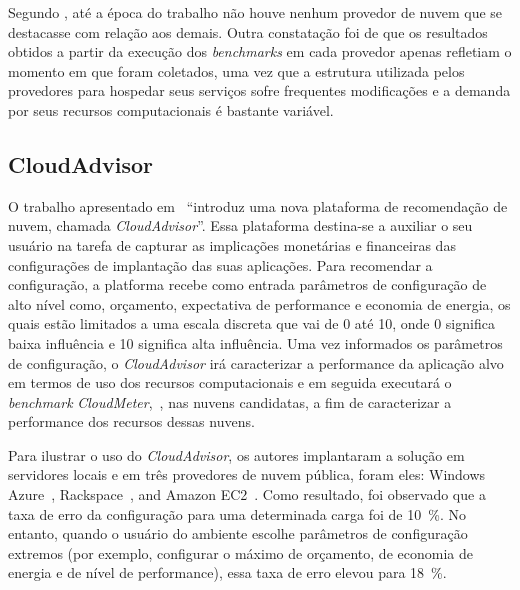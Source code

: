 Segundo , até a época do trabalho não houve
nenhum provedor de nuvem que se destacasse com relação aos demais. Outra constatação foi de que os resultados
obtidos a partir da execução dos {\em benchmarks} em cada provedor apenas refletiam o momento em que foram coletados, uma vez que a estrutura utilizada pelos provedores para hospedar seus serviços sofre frequentes modificações e a demanda por seus recursos computacionais é bastante variável.


\subsection{CloudAdvisor}
O trabalho apresentado em~\cite{jung2013cloudadvisor} ``introduz uma nova plataforma de recomendação de nuvem, chamada {\em CloudAdvisor}''. Essa plataforma destina-se a auxiliar o seu usuário na tarefa de capturar as implicações monetárias e financeiras das configurações de implantação das suas aplicações. Para recomendar a configuração, a platforma recebe como entrada parâmetros de configuração de alto nível como, orçamento, expectativa de performance e economia de energia, os quais estão limitados a uma escala discreta que vai de 0 até 10, onde 0 significa baixa influência e 10 significa alta influência. Uma vez informados os parâmetros de configuração, o {\em CloudAdvisor} irá caracterizar a performance da aplicação alvo em termos de uso dos recursos computacionais e em seguida executará o {\em benchmark} {\em CloudMeter},~\cite{jung2013cloudadvisor}, nas nuvens candidatas, a fim de caracterizar a performance dos recursos dessas nuvens.

Para ilustrar o uso do {\em CloudAdvisor}, os autores implantaram a solução em servidores locais e em três provedores de nuvem pública, foram eles: Windows Azure~\cite{azure}, Rackspace~\cite{rackspace}, and Amazon EC2~\cite{ec2}. Como resultado, foi observado que a taxa de erro da configuração para uma determinada carga foi de 10~\%. No entanto, quando o usuário do ambiente escolhe parâmetros de configuração extremos (por exemplo, configurar o máximo de orçamento, de economia de energia e de nível de performance), essa taxa de erro elevou para 18~\%.

